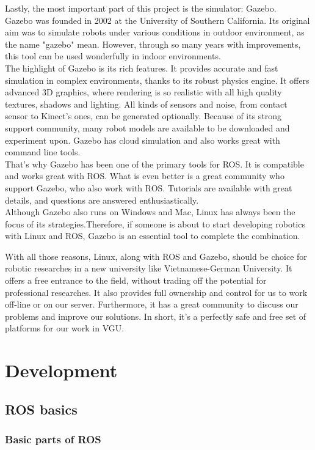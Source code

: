 \documentclass[pdftex,12pt,a4paper]{article}
\begin{document}
  Lastly, the most important part of this project is the simulator: Gazebo.\\
  Gazebo was founded in 2002 at the University of Southern California. Its original aim was to simulate robots under various conditions in outdoor environment, as the name "gazebo" mean. However, through so many years with improvements, this tool can be used wonderfully in indoor environments.\\
  The highlight of Gazebo is its rich features. It provides accurate and fast simulation in complex environments, thanks to its robust physics engine. It offers advanced 3D graphics, where rendering is so realistic with all high quality textures, shadows and lighting. All kinds of sensors and noise, from contact sensor to Kinect's ones, can be generated optionally. Because of its strong support community, many robot models are available to be downloaded and experiment upon. Gazebo has cloud simulation and also works great with command line tools.\\
  That's why Gazebo has been one of the primary tools for ROS. It is compatible and works great with ROS. What is even better is a great community who support Gazebo, who also work with ROS. Tutorials are available with great details, and questions are answered enthusiastically.\\
  Although Gazebo also runs on Windows and Mac, Linux has always been the focus of its strategies.Therefore, if someone is about to start developing robotics with Linux and ROS, Gazebo is an essential tool to complete the combination.\par
  With all those reasons, Linux, along with ROS and Gazebo, should be choice for robotic researches in a new university like Vietnamese-German University. It offers a free entrance to the field, without trading off the potential for professional researches. It also provides full ownership and control for us to work off-line or on our server. Furthermore, it has a great community to discuss our problems and improve our solutions. In short, it's a perfectly safe and free set of platforms for our work in VGU.
    
  \newpage
  \section{Development}
  \subsection{ROS basics}
  \subsubsection{Basic parts of ROS}
  
\end{document}
